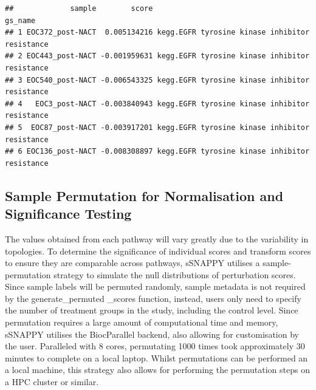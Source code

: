 \documentclass[9pt,a4paper,]{extarticle}
\newenvironment{Shaded}{\begin{snugshade}}{\end{snugshade}}
\newcommand{\FunctionTok}[1]{\textcolor[rgb]{0.00,0.00,0.00}{#1}}
\newcommand{\NormalTok}[1]{#1}
\newcommand{\OtherTok}[1]{\textcolor[rgb]{0.56,0.35,0.01}{#1}}
\newcommand{\SpecialCharTok}[1]{\textcolor[rgb]{0.00,0.00,0.00}{#1}}
\begin{document}
\begin{Shaded}
\end{Shaded}

\begin{verbatim}
##             sample        score                                        gs_name
## 1 EOC372_post-NACT  0.005134216 kegg.EGFR tyrosine kinase inhibitor resistance
## 2 EOC443_post-NACT -0.001959631 kegg.EGFR tyrosine kinase inhibitor resistance
## 3 EOC540_post-NACT -0.006543325 kegg.EGFR tyrosine kinase inhibitor resistance
## 4   EOC3_post-NACT -0.003840943 kegg.EGFR tyrosine kinase inhibitor resistance
## 5  EOC87_post-NACT -0.003917201 kegg.EGFR tyrosine kinase inhibitor resistance
## 6 EOC136_post-NACT -0.008308897 kegg.EGFR tyrosine kinase inhibitor resistance
\end{verbatim}

\hypertarget{sample-permutation-for-normalisation-and-significance-testing}{%
\subsection{Sample Permutation for Normalisation and Significance Testing}\label{sample-permutation-for-normalisation-and-significance-testing}}

The values obtained from each pathway will vary greatly due to the variability in topologies.
To determine the significance of individual scores and transform scores to ensure they are comparable across pathways, sSNAPPY utilises a sample-permutation strategy to simulate the null distributions of perturbation scores.
Since sample labels will be permuted randomly, sample metadata is not required by the generate\_permuted \_scores function, instead, users only need to specify the number of treatment groups in the study, including the control level.
Since permutation requires a large amount of computational time and memory, sSNAPPY utilises the BiocParallel backend\citep{BiocParallel}, also allowing for customisation by the user.
Paralleled with 8 cores, permutating 1000 times took approximately 30 minutes to complete on a local laptop.
Whilst permutations can be performed an a local machine, this strategy also allows for performing the permutation steps on a HPC cluster or similar.
\end{document}
